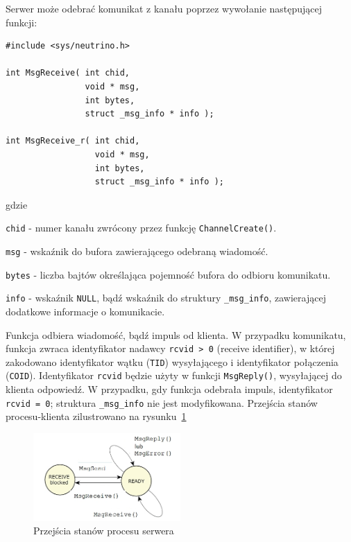 Serwer może odebrać komunikat z kanału poprzez wywołanie następującej funkcji: 

\begin{lstlisting}[style=MyCStyle]
#include <sys/neutrino.h>

int MsgReceive( int chid,
                void * msg,
                int bytes,
                struct _msg_info * info );

int MsgReceive_r( int chid,
                  void * msg,
                  int bytes,
                  struct _msg_info * info );
\end{lstlisting}

gdzie

\begin{myitemize}
\item[] \lstinline[style=MyCStyle]{chid} - numer kanału zwrócony przez funkcję \lstinline[style=MyCStyle]{ChannelCreate()}.
\item[] \lstinline[style=MyCStyle]{msg} - wskaźnik do bufora zawierającego odebraną wiadomość. 
\item[] \lstinline[style=MyCStyle]{bytes} - liczba bajtów określająca pojemność bufora do odbioru komunikatu.
\item[] \lstinline[style=MyCStyle]{info} - wskaźnik \lstinline[style=MyCStyle]{NULL}, bądź wskaźnik do struktury \lstinline[style=MyCStyle]{_msg_info}, zawierającej dodatkowe informacje o komunikacie.  
\end{myitemize}

Funkcja odbiera wiadomość, bądź impuls od klienta. W przypadku komunikatu, funkcja zwraca identyfikator nadawcy \lstinline[style=MyCStyle]{rcvid > 0} (receive identifier), w której zakodowano identyfikator wątku (\lstinline[style=MyCStyle]{TID}) wysyłającego i identyfikator połączenia (\lstinline[style=MyCStyle]{COID}). Identyfikator \lstinline[style=MyCStyle]{rcvid} będzie użyty w funkcji \lstinline[style=MyCStyle]{MsgReply()}, wysyłającej do klienta odpowiedź. W przypadku, gdy funkcja odebrała impuls, identyfikator \lstinline[style=MyCStyle]{rcvid = 0}; struktura \lstinline[style=MyCStyle]{_msg_info} nie jest modyfikowana. Przejścia stanów procesu-klienta zilustrowano na rysunku~\ref{fig:states2}

\begin{figure}[!h]
\centering
\includegraphics[width=0.5\textwidth]{img/states2}
\caption{Przejścia stanów procesu serwera}
\label{fig:states2}
\end{figure}


